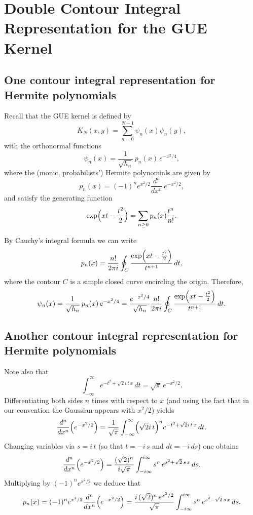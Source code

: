 \documentclass[letterpaper,11pt,oneside,reqno]{article}
\numberwithin{equation}{section}
\theoremstyle{definition}
\begin{document}
\section{Double Contour Integral Representation for the GUE Kernel}
\label{sec:double-contour}

\subsection{One contour integral representation for Hermite polynomials}

Recall that the GUE kernel is defined by
\[
K_N(x,y)=\sum_{n=0}^{N-1}\psi_n(x)\psi_n(y),
\]
with the orthonormal functions
\[
\psi_n(x)=\frac{1}{\sqrt{h_n}}\,p_n(x)\,e^{-x^2/4},
\]
where the (monic, probabilists') Hermite polynomials are given by
\[
p_n(x)=(-1)^n e^{x^2/2}\frac{d^n}{dx^n}\,e^{-x^2/2},
\]
and satisfy the generating function
\[
\exp\Bigl(xt-\frac{t^2}{2}\Bigr)=\sum_{n\ge0}p_n(x)\frac{t^n}{n!}.
\]

By Cauchy's integral formula we can write
\[
p_n(x)=\frac{n!}{2\pi i}\oint_C\frac{\exp\Bigl(xt-\frac{t^2}{2}\Bigr)}{t^{n+1}}\,dt,
\]
where the contour \(C\) is a simple closed curve encircling the origin.
Therefore,
\begin{equation*}
	\psi_n(x)=\frac{1}{\sqrt{h_n}}\,p_n(x)\,e^{-x^2/4}=
	\frac{e^{-x^2/4}}{\sqrt{h_n}}\frac{n!}{2\pi i}\oint_C\frac{\exp\Bigl(xt-\frac{t^2}{2}\Bigr)}{t^{n+1}}\,dt.
\end{equation*}


\subsection{Another contour integral representation for Hermite polynomials}

Note also that
\[
\int_{-\infty}^{\infty} e^{-t^2+\sqrt{2} i\,t\,x}\,dt
=\sqrt{\pi}\,e^{-x^2/2}.
\]
Differentiating both sides \(n\) times with respect to \(x\) (and using the fact that in our convention the Gaussian appears with \(x^2/2\)) yields
\[
\frac{d^n}{dx^n}\Bigl(e^{-x^2/2}\Bigr)
=\frac{1}{\sqrt{\pi}}\int_{-\infty}^{\infty} \Bigl(\sqrt{2}i\,t\Bigr)^n
e^{-t^2+\sqrt{2} i\,t\,x}\,dt.
\]
Changing variables via \(s=i\,t\) (so that \(t=-i\,s\) and \(dt=-i\,ds\)) one obtains
\[
\frac{d^n}{dx^n}\Bigl(e^{-x^2/2}\Bigr)
=\frac{(\sqrt{2})^n}{i\sqrt{\pi}}
\int_{-i\infty}^{i\infty} s^n\,e^{s^2+\sqrt{2}\,s\,x}\,ds.
\]
Multiplying by \((-1)^n e^{x^2/2}\) we deduce that
\begin{equation}
\label{eq:pn-contour}
p_n(x)
=(-1)^n e^{x^2/2}\frac{d^n}{dx^n}\Bigl(e^{-x^2/2}\Bigr)
=\frac{i\,(\sqrt{2})^n\,e^{x^2/2}}{\sqrt{\pi}}
\int_{-i\infty}^{i\infty} s^n\,e^{s^2-\sqrt{2}\,s\,x}\,ds.
\end{equation}
\end{document}

